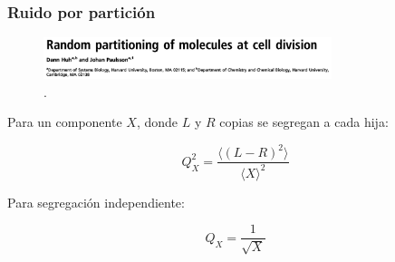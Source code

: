 \documentclass{beamer}
\begin{document}

\begin{frame}
\frametitle{Ruido por partici\'on}
\begin{figure}[p]
    \centering
    \includegraphics[width=0.75\textwidth]{huh11.png}\\
    \tiny \cite{huh11b}.
\end{figure}

Para un componente $X$, donde $L$ y $R$ copias se segregan a cada hija:

$$Q_X^2 = \frac{\langle (L-R)^2 \rangle}{\langle X \rangle^2} $$

Para segregaci\'on independiente:

$$Q_X = \frac{1}{\sqrt{X}} $$

\end{frame}
\end{document}
